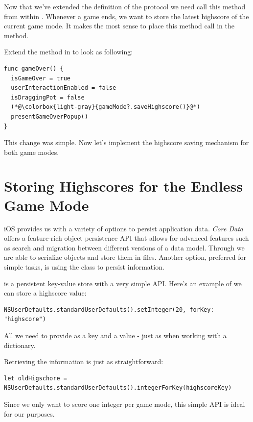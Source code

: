 Now that we've extended the definition of the protocol we need call this method
from within . Whenever a game ends, we want to store the
latest highscore of the current game mode. It makes the most sense to place this
method call in the  method.

\begin{leftbar}
Extend the  method in  to look
as following:
\begin{lstlisting}
func gameOver() {
  isGameOver = true
  userInteractionEnabled = false
  isDraggingPot = false
  (*@\colorbox{light-gray}{gameMode?.saveHighscore()}@*)
  presentGameOverPopup()
}
\end{lstlisting}
\end{leftbar}

This change was simple. Now let's implement the highscore saving mechanism for
both game modes.

\section{Storing Highscores for the Endless Game Mode}
iOS provides us with a variety of options to persist application data.
\textit{Core Data} offers a feature-rich object persistence API that allows for
advanced features such as search and migration between different versions of a data model. Through
 we are able to serialize objects and store them
in files. Another option, preferred for simple tasks, is using the
 class to persist information.

 is a persistent key-value store with a very simple
API. Here's an example of we can store a highscore value:
\begin{lstlisting}
NSUserDefaults.standardUserDefaults().setInteger(20, forKey: "highscore")
\end{lstlisting}
All we need to provide as a key and a value - just as when working with a
dictionary. 

Retrieving the information is just as straightforward:
\begin{lstlisting}
let oldHigschore =
NSUserDefaults.standardUserDefaults().integerForKey(highscoreKey)
\end{lstlisting}

Since we only want to score one integer per game mode, this simple API is ideal
for our purposes.

